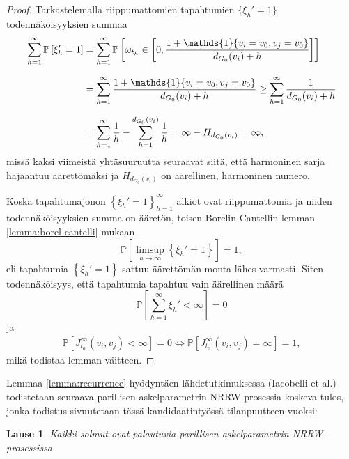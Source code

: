 \documentclass[finnish, 12pt, a4paper, sci, utf8, pdfa]{aaltothesis}
\newcommand{\indicator}{\mathopen{\mathds{1}}}
\newcommand*{\prob}{\mathbb{P}}
\newtheorem{theorem}{Lause}
\begin{document}
\begin{proof}
   Tarkastelemalla riippumattomien tapahtumien $ \{ \xi_{h}' = 1 \} $ todennäköisyyksien summaa
   \begin{equation*}
      \setlength{\jot}{10pt}
      \begin{aligned}
      \sum_{h = 1}^{\infty} \prob \left[ \xi_{h}' = 1 \right] &= \sum_{h = 1}^{\infty} \prob \left[ \omega_{t_{h}} \in \left[ 0, \frac{1 + \indicator \{ v_{i} = v_{0}, v_{j} = v_{0} \}}{d_{G_{0}}(v_{i}) + h} \right] \right] \\
         &= \sum_{h = 1}^{\infty} \frac{1 + \indicator \left\{ v_{i} = v_{0}, v_{j} = v_{0} \right\}}{d_{G_{0}}(v_{i}) + h} \geq \sum_{h = 1}^{\infty} \frac{1}{d_{G_{0}}(v_{i}) + h} \\
         &= \sum_{h = 1}^{\infty} \frac{1}{h} - \sum_{h = 1}^{d_{G_{0}}(v_{i})} \frac{1}{h} = \infty - H_{d_{G_{0}}(v_{i})} = \infty,
      \end{aligned}
   \end{equation*}
   missä kaksi viimeistä yhtäsuuruutta seuraavat siitä, että harmoninen sarja hajaantuu äärettömäksi ja $ H_{d_{G_{0}}(v_{i})} $ on äärellinen, harmoninen numero.

   Koska tapahtumajonon $ \left\{ \xi_{h}' = 1 \right\}_{h = 1}^{\infty} $ alkiot ovat riippumattomia ja niiden todennäköisyyksien summa on ääretön, toisen Borelin-Cantellin lemman 
   \ref{lemma:borel-cantelli} mukaan
   \begin{equation*}
      \prob \left[ \limsup \limits_{h \rightarrow \infty} \left\{ \xi_{h}' = 1 \right\} \right] = 1,
   \end{equation*}
   eli tapahtumia $ \left\{ \xi_{h}' = 1 \right\} $ sattuu äärettömän monta lähes varmasti. Siten todennäköisyys, että tapahtumia tapahtuu vain äärellinen määrä
   \begin{equation*}
      \prob \left[ \sum_{h = 1}^{\infty} \xi_{h}' < \infty \right] = 0
   \end{equation*}
   ja
   \begin{align*}
      \prob \left[ J_{t_{0}}^{\infty}(v_{i}, v_{j}) < \infty \right] = 0 \Leftrightarrow \prob \left[ J_{t_{0}}^{\infty}(v_{i}, v_{j}) = \infty \right] = 1,
   \end{align*}
   mikä todistaa lemman väitteen.
\end{proof}

Lemmaa \ref{lemma:recurrence} hyödyntäen lähdetutkimuksessa (Iacobelli et al.) todistetaan seuraava parillisen askelparametrin NRRW-prosessia koskeva tulos, jonka todistus sivuutetaan tässä
kandidaatintyössä tilanpuutteen vuoksi:
\begin{theorem}
Kaikki solmut ovat palautuvia parillisen askelparametrin NRRW-prosessissa. \cite{Iacobelli}
   \label{theorem:actual-recurrence}
\end{theorem}
\end{document}
